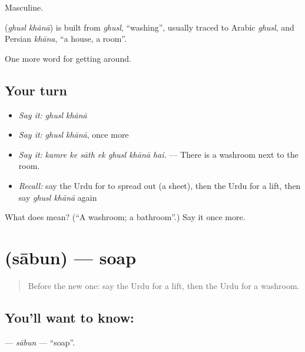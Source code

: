 Masculine.

\begin{cousinweb}
\textbf{ } (\emph{ghusl khānā}) is built from \emph{ghusl}, \textquotedblleft{}washing\textquotedblright{}, usually traced to Arabic \emph{ghusl}, and Persian \emph{khāna}, \textquotedblleft{}a house, a room\textquotedblright{}.
\end{cousinweb}

\begin{grammarlens}[title={What you've built}]
One more word for getting around.
\end{grammarlens}

\subsection*{Your turn}
\begin{itemize}
\raggedright
  \item \emph{Say it:} \emph{ghusl khānā}
  \item \emph{Say it:} \emph{ghusl khānā}, once more
  \item \emph{Say it:} \emph{kamre ke sāth ek ghusl khānā hai.} — There is a washroom next to the room.
  \item \emph{Recall:} say the Urdu for to spread out (a sheet), then the Urdu for a lift, then say \emph{ghusl khānā} again
\end{itemize}

\begin{tcolorbox}[breakable,colback=teal!4,colframe=teal!35!black,title={Before you move on}]
What does   mean? (\textquotedblleft{}A washroom; a bathroom\textquotedblright{}.) Say it once more.
\end{tcolorbox}
\section[\texorpdfstring{\ur{صابن} (sābun)}{صابن (sābun)}]{ (sābun) — soap}

\label{lesson:UR-C404-sabun}



\begin{quote}
Before the new one: say the Urdu for a lift, then the Urdu for a washroom.
\end{quote}

\subsection*{You'll want to know: }
\textbf{} — \emph{sābun} — \textquotedblleft{}soap\textquotedblright{}.

